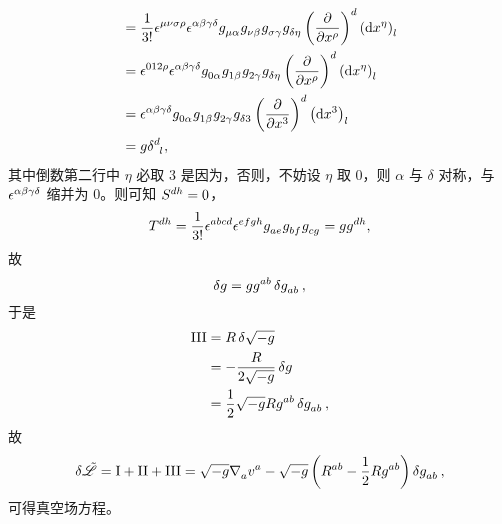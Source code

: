\begin{Proof}
\begin{equation}
\begin{split}
					&= \frac{1}{3!} \tensor{\nvol}{^\mu^\nu^\sigma^\rho} \tensor{\nvol}{^\alpha^\beta^\gamma^\delta} \tensor{g}{_\mu_\alpha} \tensor{g}{_\nu_\beta} \tensor{g}{_\sigma_\gamma} \tensor{g}{_\delta_\eta} \tensor{\left( \pdv{x^\rho} \right)}{^d} \tensor{\left( \dd{x^\eta} \right)}{_l}\\
					&= \tensor{\nvol}{^0^1^2^\rho} \tensor{\nvol}{^\alpha^\beta^\gamma^\delta} \tensor{g}{_0_\alpha} \tensor{g}{_1_\beta} \tensor{g}{_2_\gamma} \tensor{g}{_\delta_\eta} \tensor{\left( \pdv{x^\rho} \right)}{^d} \tensor{\left( \dd{x^\eta} \right)}{_l}\\
					&= \tensor{\nvol}{^\alpha^\beta^\gamma^\delta} \tensor{g}{_0_\alpha} \tensor{g}{_1_\beta} \tensor{g}{_2_\gamma} \tensor{g}{_\delta_3} \tensor{\left( \pdv{x^3} \right)}{^d} \tensor{\left( \dd{x^3} \right)}{_l}\\
					&= g\tensor{\delta}{^d_l},
				\end{split}
			\end{equation}
			其中倒数第二行中 $\eta$ 必取 $3$ 是因为，否则，不妨设 $\eta$ 取 $0$，则 $\alpha$ 与 $\delta$ 对称，与 $\tensor{\nvol}{^\alpha^\beta^\gamma^\delta}$ 缩并为 $0$。则可知 $\tensor{S}{^d^h}=0$，
			\begin{equation}
				\tensor{T}{^d^h} = \frac{1}{3!} \tensor{\nvol}{^a^b^c^d} \tensor{\nvol}{^e^f^g^h} \tensor{g}{_a_e} \tensor{g}{_b_f} \tensor{g}{_c_g} = g \tensor{g}{^d^h},
			\end{equation}
			故
			\begin{equation}
				\var{g} = g \tensor{g}{^a^b} \var{\tensor{g}{_a_b}},
			\end{equation}
			于是
			\begin{equation}
				\begin{split}
					\RomanNumeralCaps{3} &= R \var{\sqrt{-g}}\\
					&= - \frac{R}{2\sqrt{-g}} \var{g}\\
					&= \frac{1}{2} \sqrt{-g} R \tensor{g}{^a^b} \var{\tensor{g}{_a_b}},
				\end{split}
			\end{equation}
			故
			\begin{equation}
				\var{\Lad} = \RomanNumeralCaps{1} + \RomanNumeralCaps{2} + \RomanNumeralCaps{3} = \sqrt{-g} \Nabla{a} \tensor{v}{^a} - \sqrt{-g} \left( \tensor{R}{^a^b} - \frac{1}{2} R \tensor{g}{^a^b} \right) \var{\tensor{g}{_a_b}},
			\end{equation}
			可得真空场方程。
		\end{Proof}

